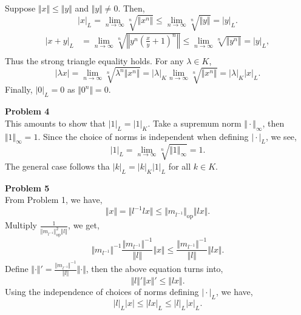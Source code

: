 \documentclass[10pt]{article}
\DeclareMathOperator{\op}{op}
\newcommand{\norm}[1]{\Vert #1 \Vert}
\newcommand{\ab}[1]{\vert #1 \vert}
\begin{document}
Suppose $\norm{x} \leq \norm{y}$ and $\norm{y}\not=0$. Then, 
\begin{equation*}
    \ab{x}_L=\lim_{n\to\infty}\sqrt[n]{\norm{x^n}}\leq\lim_{n\to\infty}\sqrt[n]{\norm{y}} = \ab{y}_L.
\end{equation*}
\begin{align*}
    \ab{x+y}_L&=\lim_{n\to\infty}\sqrt[n]{\left\Vert y^n\left({\frac x y }+1\right)^n\right\Vert}\leq \lim_{n\to\infty}\sqrt[n]{\norm{y^n}} = \ab{y}_L,\\
\end{align*}
Thus the strong triangle equality holds. For any $\lambda\in K$, 
\begin{equation*}
    \ab{\lambda x} = \lim_{n\to\infty}\sqrt[n]{\lambda^n\norm{x^n}} = \ab{\lambda}_K\lim_{n\to\infty}\sqrt[n]{\norm{x^n}} = \ab{\lambda}_K\ab{x}_L.
\end{equation*}
Finally, $\ab{0}_L=0$ as $\norm{0^n}=0$.
\par\textbf{Problem 4}\\
This amounts to show that $\ab{1}_L = \ab{1}_K$. Take a supremum norm $\norm{\cdot}_\infty$, then $\norm{1}_\infty=1$. Since the choice of norms is independent when defining $\ab{\cdot}_L$, we see,
\begin{equation*}
    \ab{1}_L = \lim_{n\to\infty}\sqrt[n]{\norm{1}_{\infty}} = 1.
\end{equation*}
The general case follows tha $\ab{k}_L = \ab{k}_K\ab{1}_L$ for all $k\in K$.
\par\textbf{Problem 5}\\
From Problem 1, we have,
\begin{equation*}
    \norm{x}= \norm{l^{-1}lx}\leq \norm{m_{l^{-1}}}_{\op}\norm{lx}.
\end{equation*}
Multiply ${\frac 1 {\norm{m_{l^{-1}}}_{\op}^2\norm{l}}}$, we get,
\begin{equation*}
    \norm{m_{l^{-1}}}^{-1}{\frac {\norm{m_{l^{-1}}}^{-1}}{\norm{l}}}\norm{x}\leq {\frac {\norm{m_{l^{-1}}}^{-1}} {\norm{l}}}\norm{lx}.
\end{equation*}
Define $\norm{\cdot}' = {\frac {\norm{m_{l^{-1}}}^{-1}} {\norm{l}}}\norm{\cdot}$, then the above equation turns into,
\begin{equation*}
    \norm{l}'\norm{x}'\leq \norm{lx}.
\end{equation*}
Using the independence of choices of norms defining $\ab{\cdot}_L$, we have,
\begin{equation*}
    \ab{l}_L\ab{x}\leq \ab{lx}_L\leq \ab{l}_L\ab{x}_L.
\end{equation*}
\end{document}
